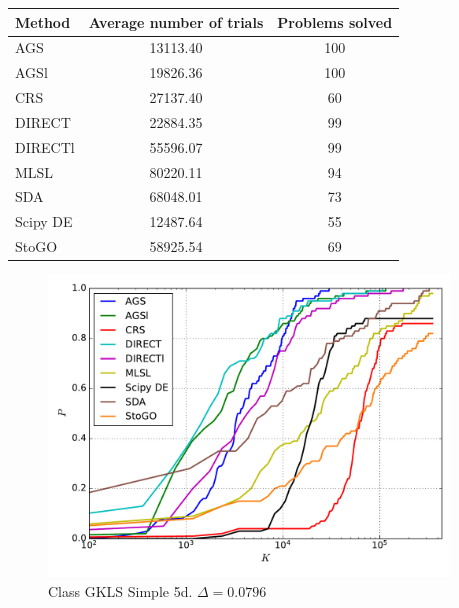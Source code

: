 \documentclass[a4paper]{article}
\begin{document}
\begin{tabular}{lcc}
\hline
 Method   &  Average number of trials  &  Problems solved  \\
\hline
 AGS      &          13113.40          &        100        \\
 AGSl     &          19826.36          &        100        \\
 CRS      &          27137.40          &        60         \\
 DIRECT   &          22884.35          &        99         \\
 DIRECTl  &          55596.07          &        99         \\
 MLSL     &          80220.11          &        94         \\
 SDA      &          68048.01          &        73         \\
 Scipy DE &          12487.64          &        55         \\
 StoGO    &          58925.54          &        69         \\
\hline
\end{tabular}
\begin{figure}[H]
  \center
  \includegraphics[width=0.95\textwidth]{../experiments/gklss5d_serg/cmc.pdf}
  \caption{Class GKLS Simple 5d. $\Delta=0.0796$}

\end{figure}
\end{document}

